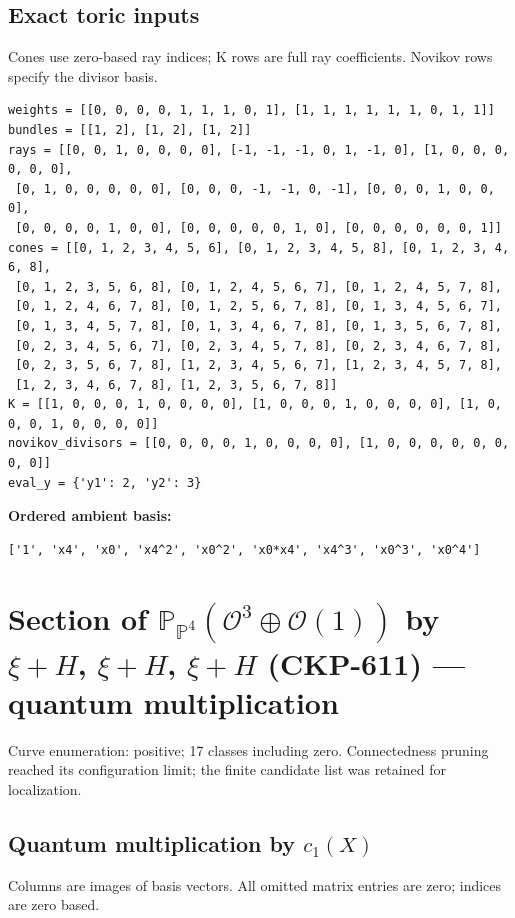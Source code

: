 \documentclass[10pt,a4paper]{article}
\begin{document}
\subsection*{Exact toric inputs}
Cones use zero-based ray indices; K rows are full ray coefficients. Novikov rows specify the divisor basis.

\begin{lstlisting}
weights = [[0, 0, 0, 0, 1, 1, 1, 0, 1], [1, 1, 1, 1, 1, 1, 0, 1, 1]]
bundles = [[1, 2], [1, 2], [1, 2]]
rays = [[0, 0, 1, 0, 0, 0, 0], [-1, -1, -1, 0, 1, -1, 0], [1, 0, 0, 0, 0, 0, 0],
 [0, 1, 0, 0, 0, 0, 0], [0, 0, 0, -1, -1, 0, -1], [0, 0, 0, 1, 0, 0, 0],
 [0, 0, 0, 0, 1, 0, 0], [0, 0, 0, 0, 0, 1, 0], [0, 0, 0, 0, 0, 0, 1]]
cones = [[0, 1, 2, 3, 4, 5, 6], [0, 1, 2, 3, 4, 5, 8], [0, 1, 2, 3, 4, 6, 8],
 [0, 1, 2, 3, 5, 6, 8], [0, 1, 2, 4, 5, 6, 7], [0, 1, 2, 4, 5, 7, 8],
 [0, 1, 2, 4, 6, 7, 8], [0, 1, 2, 5, 6, 7, 8], [0, 1, 3, 4, 5, 6, 7],
 [0, 1, 3, 4, 5, 7, 8], [0, 1, 3, 4, 6, 7, 8], [0, 1, 3, 5, 6, 7, 8],
 [0, 2, 3, 4, 5, 6, 7], [0, 2, 3, 4, 5, 7, 8], [0, 2, 3, 4, 6, 7, 8],
 [0, 2, 3, 5, 6, 7, 8], [1, 2, 3, 4, 5, 6, 7], [1, 2, 3, 4, 5, 7, 8],
 [1, 2, 3, 4, 6, 7, 8], [1, 2, 3, 5, 6, 7, 8]]
K = [[1, 0, 0, 0, 1, 0, 0, 0, 0], [1, 0, 0, 0, 1, 0, 0, 0, 0], [1, 0, 0, 0, 1, 0, 0, 0, 0]]
novikov_divisors = [[0, 0, 0, 0, 1, 0, 0, 0, 0], [1, 0, 0, 0, 0, 0, 0, 0, 0]]
eval_y = {'y1': 2, 'y2': 3}
\end{lstlisting}

\textbf{Ordered ambient basis:}
\begin{lstlisting}
['1', 'x4', 'x0', 'x4^2', 'x0^2', 'x0*x4', 'x4^3', 'x0^3', 'x0^4']
\end{lstlisting}

\clearpage\section*{Section of $\mathbb P_{\mathbb P^{4}}(\mathcal O^{3}\oplus \mathcal O(1))$ by $\xi +H$, $\xi +H$, $\xi +H$ (CKP-611) --- quantum multiplication}

Curve enumeration: positive; 17 classes including zero.
Connectedness pruning reached its configuration limit; the finite candidate list was retained for localization.
\subsection*{Quantum multiplication by $c_1(X)$}
Columns are images of basis vectors. All omitted matrix entries are zero; indices are zero based.
\end{document}
